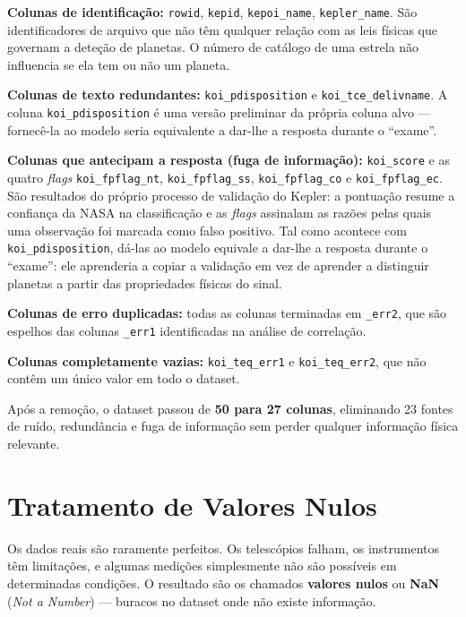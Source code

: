 \documentclass[12pt, a4paper]{report}
\begin{document}
\textbf{Colunas de identificação:} \texttt{rowid}, \texttt{kepid}, \texttt{kepoi\_name}, \texttt{kepler\_name}. São identificadores de arquivo que não têm qualquer relação com as leis físicas que governam a deteção de planetas. O número de catálogo de uma estrela não influencia se ela tem ou não um planeta.

\textbf{Colunas de texto redundantes:} \texttt{koi\_pdisposition} e \texttt{koi\_tce\_delivname}. A coluna \texttt{koi\_pdisposition} é uma versão preliminar da própria coluna alvo — fornecê-la ao modelo seria equivalente a dar-lhe a resposta durante o ``exame''.

\textbf{Colunas que antecipam a resposta (fuga de informação):} \texttt{koi\_score} e as quatro \textit{flags} \texttt{koi\_fpflag\_nt}, \texttt{koi\_fpflag\_ss}, \texttt{koi\_fpflag\_co} e \texttt{koi\_fpflag\_ec}. São resultados do próprio processo de validação do Kepler: a pontuação resume a confiança da NASA na classificação e as \textit{flags} assinalam as razões pelas quais uma observação foi marcada como falso positivo. Tal como acontece com \texttt{koi\_pdisposition}, dá-las ao modelo equivale a dar-lhe a resposta durante o ``exame'': ele aprenderia a copiar a validação em vez de aprender a distinguir planetas a partir das propriedades físicas do sinal.

\textbf{Colunas de erro duplicadas:} todas as colunas terminadas em \texttt{\_err2}, que são espelhos das colunas \texttt{\_err1} identificadas na análise de correlação.

\textbf{Colunas completamente vazias:} \texttt{koi\_teq\_err1} e \texttt{koi\_teq\_err2}, que não contêm um único valor em todo o dataset.

\begin{caixaresultado}
Após a remoção, o dataset passou de \textbf{50 para 27 colunas}, eliminando 23 fontes de ruído, redundância e fuga de informação sem perder qualquer informação física relevante.
\end{caixaresultado}

\section{Tratamento de Valores Nulos}

Os dados reais são raramente perfeitos. Os telescópios falham, os instrumentos têm limitações, e algumas medições simplesmente não são possíveis em determinadas condições. O resultado são os chamados \textbf{valores nulos} ou \textbf{NaN} (\textit{Not a Number}) — buracos no dataset onde não existe informação.
\end{document}
